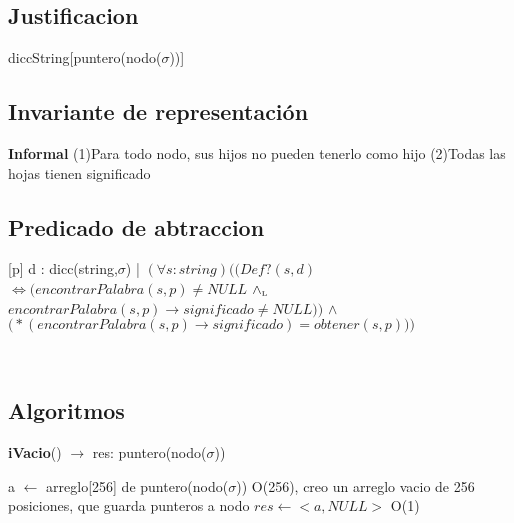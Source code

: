\begin{Representacion}
\subsection{Justificacion}
	\begin{Estructura}{diccString}[puntero(nodo($\sigma$))]
		\begin{Tupla}[nodo]
		\end{Tupla}
	\end{Estructura}
\subsection{Invariante de representación}

\textbf{Informal}
(1)Para todo nodo, sus hijos no pueden tenerlo como hijo
(2)Todas las hojas tienen significado

\subsection{Predicado de abtraccion}

[p]{ d : dicc(string,$\sigma$) | $(\forall s:string)\Big( \big(Def?(s,d)$ $\Longleftrightarrow (encontrarPalabra(s,p) \neq NULL$ $\land_{\mathrm{\scriptscriptstyle{L}}}$ $encontrarPalabra(s,p)\to significado \neq NULL)\big)$ $\land$ $\big(*(encontrarPalabra(s,p)\to significado) = obtener(s,p)\big)\Big)$}


~  

\subsection{Algoritmos}

\begin{Algoritmos}

\begin{algorithm}[H]{\textbf{iVacio}() $\to$ res: puntero(nodo($\sigma$))}
	\begin{algorithmic}[1]
		\State a $\gets$ arreglo[256] de puntero(nodo($\sigma$)) \Comment O(256), creo un arreglo vacio de 256 posiciones, que guarda punteros a nodo
		\State $res \gets <a, NULL>$ \Comment O(1)
		

\end{algorithmic}
\end{algorithm}
\end{Algoritmos}
\end{Representacion}
